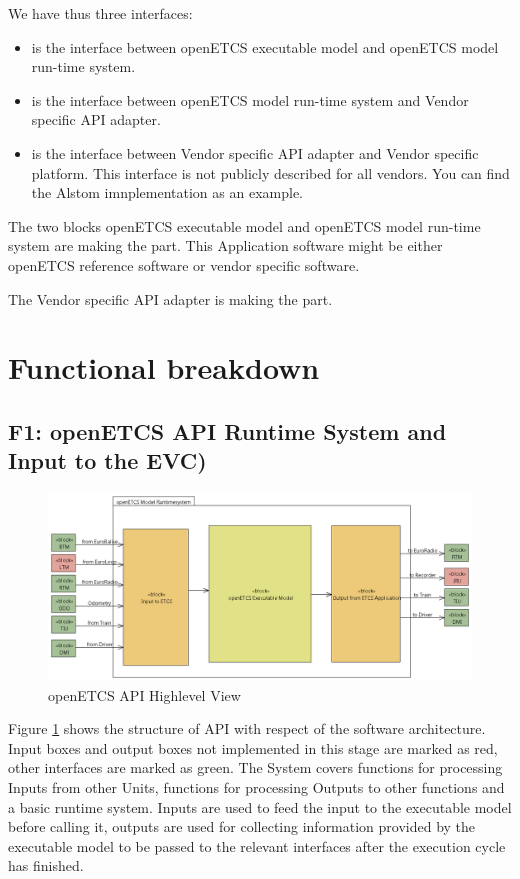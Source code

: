 \documentclass{template/openetcs_report}
\begin{document}
We have thus three interfaces:
\begin{itemize}
\item {}
 is the interface between openETCS
  executable model and openETCS model run-time system. 
\item {}
 is the interface between openETCS model
  run-time system and Vendor specific \gls{API} adapter.
\item {}
 is the interface between Vendor
  specific \gls{API} adapter and Vendor specific platform. This interface is
  not publicly described for all vendors. You can find the Alstom imnplementation as an example.
\end{itemize}

The two blocks openETCS executable model and openETCS model run-time
system are making the  part. This Application software might be either openETCS reference software or
vendor specific software.

The Vendor specific \gls{API} adapter is making the  part.


\section{Functional breakdown}


\subsection{F1: openETCS \gls{API} Runtime System and Input to the EVC)}

\begin{figure}[hbtp]
\centering
\includegraphics[width=\linewidth]{openETCSAPI.png}
\caption{openETCS API Highlevel View}
\label{fig:apiHighLevel}
\end{figure}

Figure \ref{fig:apiHighLevel} shows the structure of API with respect of the software architecture. Input boxes and output boxes not implemented in this stage are marked as red, other interfaces are marked as green. The System covers functions for processing Inputs from other Units, functions for processing Outputs to other functions and a basic runtime system. Inputs are used to feed the input to the executable model before calling it, outputs are used for collecting information provided by the executable model to be passed to the relevant interfaces after the execution cycle has finished.
\end{document}
